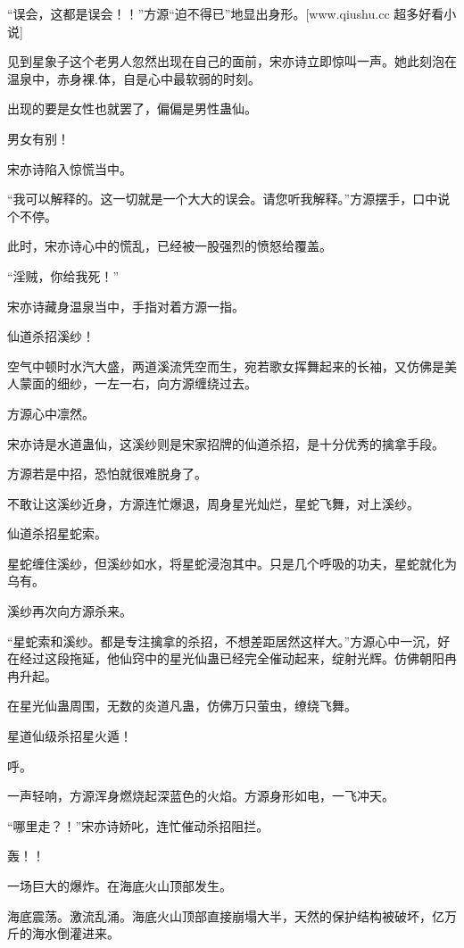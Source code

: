 
\begin{this_body}

“误会，这都是误会！！”方源“迫不得已”地显出身形。[www.qiushu.cc 超多好看小说]

见到星象子这个老男人忽然出现在自己的面前，宋亦诗立即惊叫一声。她此刻泡在温泉中，赤身裸.体，自是心中最软弱的时刻。

出现的要是女性也就罢了，偏偏是男性蛊仙。

男女有别！

宋亦诗陷入惊慌当中。

“我可以解释的。这一切就是一个大大的误会。请您听我解释。”方源摆手，口中说个不停。

此时，宋亦诗心中的慌乱，已经被一股强烈的愤怒给覆盖。

“淫贼，你给我死！”

宋亦诗藏身温泉当中，手指对着方源一指。

仙道杀招溪纱！

空气中顿时水汽大盛，两道溪流凭空而生，宛若歌女挥舞起来的长袖，又仿佛是美人蒙面的细纱，一左一右，向方源缠绕过去。

方源心中凛然。

宋亦诗是水道蛊仙，这溪纱则是宋家招牌的仙道杀招，是十分优秀的擒拿手段。

方源若是中招，恐怕就很难脱身了。

不敢让这溪纱近身，方源连忙爆退，周身星光灿烂，星蛇飞舞，对上溪纱。

仙道杀招星蛇索。

星蛇缠住溪纱，但溪纱如水，将星蛇浸泡其中。只是几个呼吸的功夫，星蛇就化为乌有。

溪纱再次向方源杀来。

“星蛇索和溪纱。都是专注擒拿的杀招，不想差距居然这样大。”方源心中一沉，好在经过这段拖延，他仙窍中的星光仙蛊已经完全催动起来，绽射光辉。仿佛朝阳冉冉升起。

在星光仙蛊周围，无数的炎道凡蛊，仿佛万只萤虫，缭绕飞舞。

星道仙级杀招星火遁！

呼。

一声轻响，方源浑身燃烧起深蓝色的火焰。方源身形如电，一飞冲天。

“哪里走？！”宋亦诗娇叱，连忙催动杀招阻拦。

轰！！

一场巨大的爆炸。在海底火山顶部发生。

海底震荡。激流乱涌。海底火山顶部直接崩塌大半，天然的保护结构被破坏，亿万斤的海水倒灌进来。


\end{this_body}
